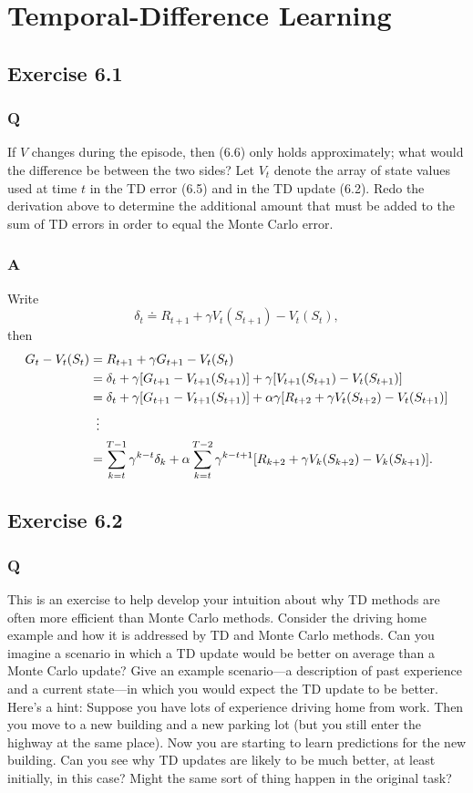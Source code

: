 \section{Temporal-Difference Learning}

\subsection{Exercise 6.1}
\subsubsection{Q}
If $V$ changes during the episode, then (6.6) only holds approximately; what would the difference be between the two sides? Let $V_t$ denote the array of state values used at time $t$ in the TD error (6.5) and in the TD update (6.2). Redo the derivation above to determine the additional amount that must be added to the sum of TD errors in order to equal the Monte Carlo error.
\subsubsection{A}
Write
\[
    \delta_t \doteq R_{t+1} + \gamma V_t(S_{t+1}) - V_t(S_t),
\]
then
\begin{align}
    G_t - V_t(S_t) &= R_{t+1} + \gamma G_{t+1} - V_t(S_t) \\
                   &= \delta_t + \gamma [ G_{t+1} - V_{t+1}(S_{t+1})] + \gamma [V_{t+1}(S_{t+1}) - V_t(S_{t+1})]\\
                   &= \delta_t + \gamma [ G_{t+1} - V_{t+1}(S_{t+1})] + \alpha \gamma [R_{t+2} + \gamma V_t(S_{t+2}) - V_t(S_{t+1})]\\
                   &\vdotswithin{=} \notag\\
                   &= \sum_{k=t}^{T-1} \gamma^{k-t} \delta_k + \alpha \sum_{k=t}^{T-2} \gamma^{k-t+1} [R_{k+2} + \gamma V_k(S_{k+2}) - V_k(S_{k+1})].
\end{align}
                   
\subsection{Exercise 6.2}
\subsubsection{Q}
This is an exercise to help develop your intuition about why TD methods are often more efficient than Monte Carlo methods. Consider the driving home example and how it is addressed by TD and Monte Carlo methods. Can you imagine a scenario in which a TD update would be better on average than a Monte Carlo update? Give an example scenario—a description of past experience and a current state—in which you would expect the TD update to be better. Here’s a hint: Suppose you have lots of experience driving home from work. Then you move to a new building and a new parking lot (but you still enter the highway at the same place). Now you are starting to learn predictions for the new building. Can you see why TD updates are likely to be much better, at least initially, in this case? Might the same sort of thing happen in the original task?
